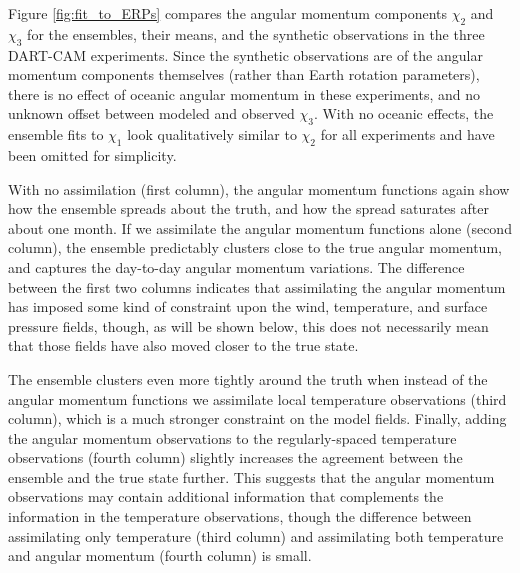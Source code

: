 Figure \ref{fig:fit_to_ERPs} compares the angular momentum components $\chi_2$ and $\chi_3$ for the ensembles, their means, and the synthetic observations in the three DART-CAM experiments. 
Since the synthetic observations are of the angular momentum components themselves (rather than Earth rotation parameters), there is no effect of oceanic angular momentum in these experiments, and no unknown offset between modeled and observed $\chi_3$. 
With no oceanic effects, the ensemble fits to $\chi_1$ look qualitatively similar to $\chi_2$ for all experiments and have been omitted for simplicity. 

With no assimilation (first column), the angular momentum functions again show how the ensemble spreads about the truth, and how the spread saturates after about one month.
If we assimilate the angular momentum functions alone (second column), the ensemble predictably clusters close to the true angular momentum, and captures the day-to-day angular momentum variations. 
The difference between the first two columns indicates that assimilating the angular momentum has imposed some kind of constraint upon the wind, temperature, and surface pressure fields, though, as will be shown below, this does not necessarily mean that those fields have also moved closer to the true state. 

The ensemble clusters even more tightly around the truth when instead of the angular momentum functions we assimilate local temperature observations (third column), which is a much stronger constraint on the model fields. 
Finally, adding the angular momentum observations to the regularly-spaced temperature observations (fourth column) slightly increases the agreement between the ensemble and the true state further.  
This suggests that the angular momentum observations may contain additional information that complements the information in the temperature observations, though the difference between assimilating only temperature (third column) and assimilating both temperature and angular momentum (fourth column) is small.  
